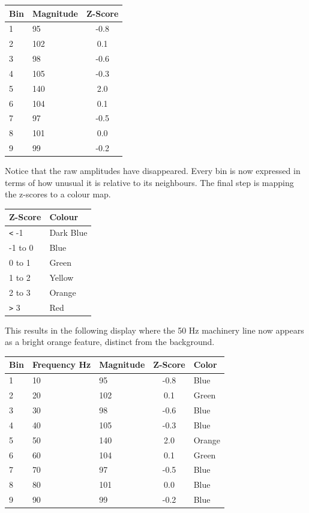  \begin{tabular}{llc}
    Bin & Magnitude & Z-Score \\
    \hline
    1 & 95 & -0.8\\
    2 & 102 & 0.1\\
    3 & 98 & -0.6\\
    4 & 105 & -0.3\\
    5 & 140 & 2.0\\
    6 & 104 & 0.1\\
    7 & 97 & -0.5\\
    8 & 101 & 0.0\\
    9 & 99 & -0.2
 \end{tabular}

Notice that the raw amplitudes have disappeared. Every bin is now expressed in terms of how unusual it is relative to its neighbours. The final step is mapping the z-scores to a colour map.

\begin{tabular}{ll}
    Z-Score & Colour \\
    \hline
    \verb|<| -1 & Dark Blue \\
    -1 to 0 & Blue \\
    0 to 1 & Green \\
    1 to 2 & Yellow \\
    2 to 3 & Orange \\
    \verb|>| 3 & Red
 \end{tabular}

This results in the following display where the 50 Hz machinery line now appears as a bright orange feature, distinct from the background.

 \begin{tabular}{lllcl}
    Bin & Frequency Hz & Magnitude & Z-Score & Color\\
    \hline
    1 & 10 & 95 & -0.8 & Blue\\
    2 & 20 & 102 & 0.1 & Green\\
    3 & 30 & 98 & -0.6 & Blue\\
    4 & 40 & 105 & -0.3 & Blue\\
    5 & 50 & 140 & 2.0 & Orange\\
    6 & 60 & 104 & 0.1 & Green\\
    7 & 70 & 97 & -0.5 & Blue\\
    8 & 80 & 101 & 0.0 & Blue\\
    9 & 90 & 99 & -0.2 & Blue
 \end{tabular}

